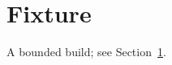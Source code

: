 \documentclass{article}
\begin{document}
\section{Fixture}\label{sec:fixture}
A bounded build; see Section~\ref{sec:fixture}.
\end{document}
